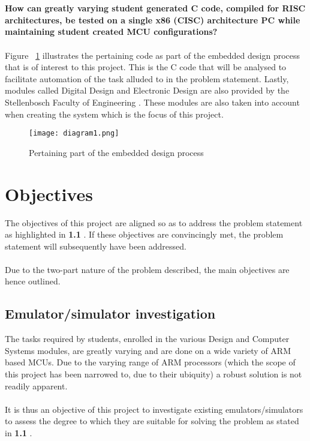 \\\\
\textbf{How can greatly varying student generated C code, compiled for RISC architectures, be tested on a single x86 (CISC) architecture PC while maintaining student created MCU configurations?}
\\\\
Figure ~\ref{fig:introDia} illustrates the pertaining code as part of the embedded design process that is of interest to this project. This is the C code that will be analysed to facilitate automation of the task alluded to in the problem statement. Lastly, modules called Digital Design and Electronic Design are also provided by the Stellenbosch Faculty of Engineering \cite{Stelle2020}. These modules are also taken into account when creating the system which is the focus of this project.
\begin{figure}[H]
\begin{center}
\texttt{[image: diagram1.png]}
\caption{Pertaining part of the embedded design process}
\label{fig:introDia}
\end{center}
\end{figure}

\section{Objectives}
\label{obj}
The objectives of this project are aligned so as to address the problem statement as highlighted in \textbf{1.1 }. If these objectives are convincingly  met, the problem statement will subsequently have been addressed.
\\\\
Due to the two-part nature of the problem described, the main objectives are hence outlined.
\subsection{Emulator/simulator investigation}
\label{emInvestObj}
The tasks required by students, enrolled in the various Design and Computer Systems modules, are greatly varying and are done on a wide variety of ARM based MCUs. Due to the varying range of ARM processors (which the scope of this project has been narrowed to, due to their ubiquity) a robust solution is not readily apparent.
\\\\
It is thus an objective of this project to investigate existing emulators/simulators to assess the degree to which they are suitable for solving the problem as stated in \textbf{1.1 }.
